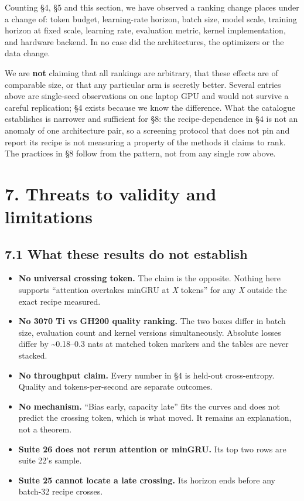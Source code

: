 Counting \S4, \S5 and this section, we have observed a ranking change places under a change of:
token budget, learning-rate horizon, batch size, model scale, training horizon at fixed scale,
learning rate, evaluation metric, kernel implementation, and hardware backend. In no case did the
architectures, the optimizers or the data change.

We are \textbf{not} claiming that all rankings are arbitrary, that these effects are of comparable size,
or that any particular arm is secretly better. Several entries above are single-seed observations
on one laptop GPU and would not survive a careful replication; \S4 exists because we know the
difference. What the catalogue establishes is narrower and sufficient for \S8: the recipe-dependence
in \S4 is not an anomaly of one architecture pair, so a screening protocol that does not pin and
report its recipe is not measuring a property of the methods it claims to rank. The practices in
\S8 follow from the pattern, not from any single row above.

\section{7. Threats to validity and limitations}\label{threats-to-validity-and-limitations}

\subsection{7.1 What these results do not establish}\label{what-these-results-do-not-establish}

\begin{itemize}
\tightlist
\item
  \textbf{No universal crossing token.} The claim is the opposite. Nothing here supports ``attention
  overtakes minGRU at \emph{X} tokens'' for any \emph{X} outside the exact recipe measured.
\item
  \textbf{No 3070 Ti vs GH200 quality ranking.} The two boxes differ in batch size, evaluation count
  and kernel versions simultaneously. Absolute losses differ by \textasciitilde0.18--0.3 nats at matched token
  markers and the tables are never stacked.
\item
  \textbf{No throughput claim.} Every number in \S4 is held-out cross-entropy. Quality and
  tokens-per-second are separate outcomes.
\item
  \textbf{No mechanism.} ``Bias early, capacity late'' fits the curves and does not predict the crossing
  token, which is what moved. It remains an explanation, not a theorem.
\item
  \textbf{Suite 26 does not rerun attention or minGRU.} Its top two rows are suite 22's sample.
\item
  \textbf{Suite 25 cannot locate a late crossing.} Its horizon ends before any batch-32 recipe crosses.
\end{itemize}

